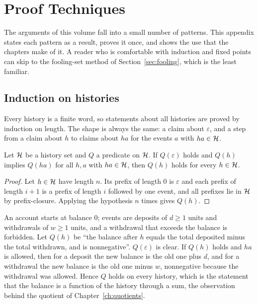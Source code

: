 \chapter{Proof Techniques}\label{app:proof}

The arguments of this volume fall into a small number of patterns. This appendix states each pattern as a result, proves it once, and shows the use that the chapters make of it. A reader who is comfortable with induction and fixed points can skip to the fooling-set method of Section~\ref{sec:fooling}, which is the least familiar.

\section{Induction on histories}

Every history is a finite word, so statements about all histories are proved by induction on length. The shape is always the same: a claim about $\varepsilon$, and a step from a claim about $h$ to claims about $ha$ for the events $a$ with $ha\in\mathcal{H}$.

\begin{established}\label{pa:induction}
Let $\mathcal{H}$ be a history set and $Q$ a predicate on $\mathcal{H}$. If $Q(\varepsilon)$ holds and $Q(h)$ implies $Q(ha)$ for all $h,a$ with $ha\in\mathcal{H}$, then $Q(h)$ holds for every $h\in\mathcal{H}$.
\end{established}
\begin{proof}
Let $h\in\mathcal{H}$ have length $n$. Its prefix of length $0$ is $\varepsilon$ and each prefix of length $i+1$ is a prefix of length $i$ followed by one event, and all prefixes lie in $\mathcal{H}$ by prefix-closure. Applying the hypothesis $n$ times gives $Q(h)$.
\end{proof}

\begin{example}\label{pa:ex-account}
An account starts at balance $0$; events are deposits of $d\ge1$ units and withdrawals of $w\ge1$ units, and a withdrawal that exceeds the balance is forbidden. Let $Q(h)$ be ``the balance after $h$ equals the total deposited minus the total withdrawn, and is nonnegative''. $Q(\varepsilon)$ is clear. If $Q(h)$ holds and $ha$ is allowed, then for a deposit the new balance is the old one plus $d$, and for a withdrawal the new balance is the old one minus $w$, nonnegative because the withdrawal was allowed. Hence $Q$ holds on every history, which is the statement that the balance is a function of the history through a sum, the observation behind the quotient of Chapter~\ref{ch:quotients}.
\end{example}


